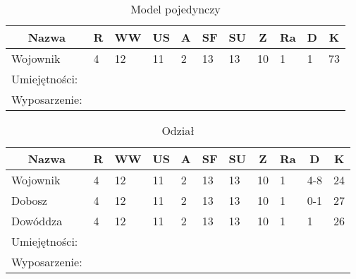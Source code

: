 

\begin{table}[h]
\caption{Model pojedynczy}

\begin{tabular}{|l|l|l|l|l|l|l|l|l|l|l|}
\hline
\multicolumn{1}{c}{Nazwa} & \multicolumn{1}{c}{R} & \multicolumn{1}{c}{WW} & \multicolumn{1}{c}{US} & \multicolumn{1}{c}{A} & \multicolumn{1}{c}{SF} & \multicolumn{1}{c}{SU} & \multicolumn{1}{c}{Z} & \multicolumn{1}{c}{Ra} & \multicolumn{1}{c}{D} & \multicolumn{1}{c}{K} \\ \hline
Wojownik & 4 & 12 & 11 & 2 & 13 & 13 & 10 & 1 & 1 & 73 \\ \hline
Umiejętności: \\ \hline
Wyposarzenie: \\ \hline
\end{tabular}

\end{table}

\begin{table}[h]
\caption{Odział}

\begin{tabular}{|l|l|l|l|l|l|l|l|l|l|l|}
\hline
\multicolumn{1}{c}{Nazwa} & \multicolumn{1}{c}{R} & \multicolumn{1}{c}{WW} & \multicolumn{1}{c}{US} & \multicolumn{1}{c}{A} & \multicolumn{1}{c}{SF} & \multicolumn{1}{c}{SU} & \multicolumn{1}{c}{Z} & \multicolumn{1}{c}{Ra} & \multicolumn{1}{c}{D} & \multicolumn{1}{c}{K} \\ \hline
Wojownik & 4 & 12 & 11 & 2 & 13 & 13 & 10 & 1 & 4-8 & 24  \\ \hline
Dobosz & 4 & 12 & 11 & 2 & 13 & 13 & 10 & 1 & 0-1 & 27 \\ \hline
Dowóddza & 4 & 12 & 11 & 2 & 13 & 13 & 10 & 1 & 1 & 26 \\ \hline
Umiejętności: \\ \hline
Wyposarzenie: \\ \hline
\end{tabular}

\end{table}
